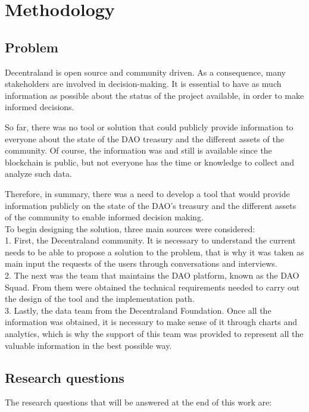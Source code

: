 \documentclass[MSE,Master,english]{twbook}%
\begin{document}
\chapter{Methodology\label{method}}
\section{Problem}
Decentraland is open source and community driven. As a consequence, many stakeholders are involved in decision-making. It is essential to have as much information as possible about the status of the project available, in order to make informed decisions.

So far, there was no tool or solution that could publicly provide information to everyone about the state of the DAO treasury and the different assets of the community. Of course, the information was and still is available since the blockchain is public, but not everyone has the time or knowledge to collect and analyze such data.

Therefore, in summary, there was a need to develop a tool that would provide information publicly on the state of the DAO's treasury and the different assets of the community to enable informed decision making. \\

To begin designing the solution, three main sources were considered: \\

1. First, the Decentraland community. It is necessary to understand the current needs to be able to propose a solution to the problem, that is why it was taken as main input the requests of the users through conversations and interviews. \\

2. The next was the team that maintains the DAO platform, known as the DAO Squad. From them were obtained the technical requirements needed to carry out the design of the tool and the implementation path.\\

3. Lastly, the data team from the Decentraland Foundation. Once all the information was obtained, it is necessary to make sense of it through charts and analytics, which is why the support of this team was provided to represent all the valuable information in the best possible way.\\

\section{Research questions\label{research}}
The research questions that will be answered at the end of this work are: \\
\end{document}
